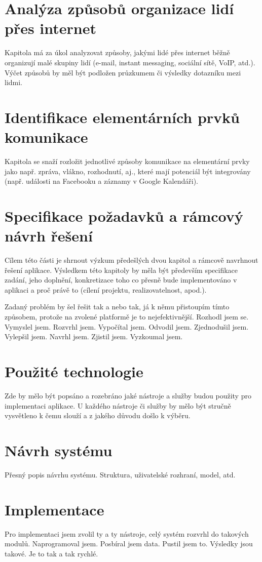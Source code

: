 \documentclass[12pt,oneside,final]{fithesis2}
\begin{document}
\chapter{Analýza způsobů organizace lidí přes internet}
Kapitola má za úkol analyzovat způsoby, jakými lidé přes internet běžně
organizují malé skupiny lidí (e-mail, instant messaging, sociální sítě,
VoIP, atd.). Výčet způsobů by měl být podložen průzkumem či výsledky dotazníku mezi lidmi.

\chapter{Identifikace elementárních prvků komunikace}
Kapitola se snaží rozložit jednotlivé způsoby komunikace na elementární
prvky jako např. zpráva, vlákno, rozhodnutí, aj., které mají potenciál být
integrovány (např. události na Facebooku a záznamy v Google Kalendáři).

\chapter{Specifikace požadavků a rámcový návrh řešení}
Cílem této části je shrnout výzkum předešlých dvou kapitol a rámcově navrhnout řešení aplikace. Výsledkem této kapitoly by měla být především specifikace zadání, jeho doplnění, konkretizace toho co přesně bude implementováno v aplikaci a proč právě to (cílení projektu, realizovatelnost, apod.).

Zadaný problém by šel řešit tak a nebo tak, já k němu přistoupím tímto způsobem, protože na zvolené platformě je to nejefektivnější. Rozhodl jsem se. Vymyslel jsem. Rozvrhl jsem. Vypočítal jsem. Odvodil jsem. Zjednodušil jsem. Vylepšil jsem. Navrhl jsem. Zjistil jsem. Vyzkoumal jsem.

\chapter{Použité technologie}
Zde by mělo být popsáno a rozebráno jaké nástroje a služby budou použity pro implementaci aplikace. U každého nástroje či služby by mělo být stručně vysvětleno k čemu slouží a z jakého důvodu došlo k výběru.

\chapter{Návrh systému}
Přesný popis návrhu systému. Struktura, uživatelské rozhraní, model, atd.

\chapter{Implementace}
Pro implementaci jsem zvolil ty a ty nástroje, celý systém rozvrhl do takových modulů. Naprogramoval jsem. Posbíral jsem data. Pustil jsem to. Výsledky jsou takové. Je to tak a tak rychlé.
\end{document}
